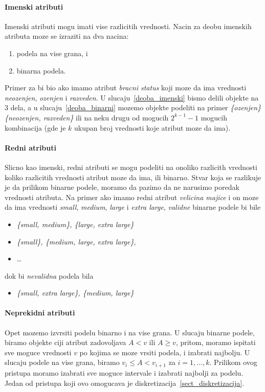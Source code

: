 \documentclass[a4paper]{article}
\begin{document}
\paragraph{Imenski atributi} Imenski atributi mogu imati vise razlicitih vrednosti. Nacin za deobu
imenskih atributa moze se izraziti na dva nacina:
\begin{enumerate}
    \item\label{deoba_imenski} podela na vise grana, i
    \item\label{deoba_binarni} binarna podela.
\end{enumerate}
Primer za bi bio ako imamo atribut \emph{bracni status} koji moze da ima
vrednosti \emph{neozenjen}, \emph{ozenjen} i \emph{razveden}. U slucaju~\ref{deoba_imenski} bismo
delili objekte na 3 dela, a u slucaju~\ref{deoba_binarni} mozemo objekte podeliti na primer
\emph{\{ozenjen\} \{neozenjen, razveden\}} ili na neku drugu od mogucih \(2^{k-1}-1\) mogucih
kombinacija (gde je \(k\) ukupan broj vrednosti koje atribut moze da ima).

\paragraph{Redni atributi} Slicno kao imenski, redni atributi se mogu podeliti na onoliko razlicith
vrednosti koliko razlicitih vrednosti atribut moze da ima, ili binarno. Stvar koja se razlikuje je
da prilikom binarne podele, moramo da pazimo da ne narusimo poredak vrednosti atributa. Na primer
ako imamo redni atribut \emph{velicina majice} i on moze da ima vrednosti \emph{small},
\emph{medium}, \emph{large} i \emph{extra large}, \emph{validne} binarne podele bi bile
\begin{itemize}
    \item \emph{\{small, medium\}, \{large, extra large\}}
    \item \emph{\{small\}, \{medium, large, extra large\}},
    \item \ldots
\end{itemize}
 
dok bi \emph{nevalidna} podela bila
\begin{itemize}
    \item \emph{\{small, extra large\}, \{medium, large\}}
\end{itemize}

\paragraph{Neprekidni atributi} Opet mozemo izvrsiti podelu binarno i na vise grana. U slucaju
binarne podele, biramo objekte ciji atribut zadovoljava \(A < v\) ili  \(A \geqslant v\), pritom,
moramo ispitati sve moguce vrednosti \(v\) po kojima se moze vrsiti podela, i izabrati najbolju. U
slucaju podele na vise grana, biramo \(v_i \leqslant A < v_{i+1}\) za \(i=1,\ldots,k\). Prilikom
ovog pristupa moramo izabrati sve moguce intervale i izabrati najbolji za podelu. Jedan od pristupa
koji ovo omogucava je diskretizacija~\ref{sect_diskretizacija}.
\end{document}

